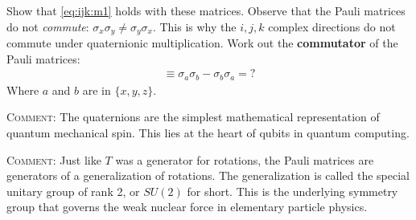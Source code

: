 \documentclass[12pt]{article}
\numberwithin{equation}{section}    %
\begin{document}
Show that \eqref{eq:ijk:m1} holds with these matrices. Observe that the Pauli matrices do not \emph{commute}: $\sigma_x\sigma_y \neq \sigma_y\sigma_x$. This is why the $i,j,k$ complex directions do not commute under quaternionic multiplication. Work out the \textbf{commutator} of the Pauli matrices:
\begin{align}
	[\sigma_a,\sigma_b] \equiv \sigma_a\sigma_b -\sigma_b\sigma_a  = ?
\end{align}
Where $a$ and $b$ are in $\{x,y,z\}$.

\textsc{Comment:} The quaternions are the simplest mathematical representation of quantum mechanical spin. This lies at the heart of qubits in quantum computing. 

\textsc{Comment:} Just like $T$ was a generator for rotations, the Pauli matrices are generators of a generalization of rotations. The generalization is called the special unitary group of rank 2, or $SU(2)$ for short. This is the underlying symmetry group that governs the weak nuclear force in elementary particle physics.
\end{document}
